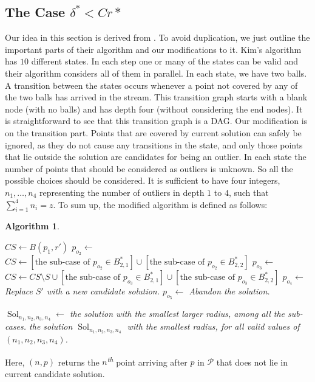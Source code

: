 \documentclass[envcountsame]{cls/cccg15}
\newtheorem{algorithm}{Algorithm}
\newcommand{\nth}{\textsuperscript{\textit{th}} }
\newcommand{\set}[1]{\left\{ #1 \right\}}
\newcommand{\provided}{\,:\,}
\begin{document}
\subsection{The Case $\delta^* < C r*$}
\label{subsec:smaller}
Our idea in this section is derived from \cite{ahn2014computing, kim2014improved}. To avoid duplication, we just outline the important parts of their algorithm and our modifications to it. Kim's algorithm has $10$ different states. In each step one or many of the states can be valid and their algorithm considers all of them in parallel. In each state, we have two balls. A transition between the states occurs whenever a point not covered by any of the two balls has arrived in the stream. This transition graph starts with a blank node (with no balls) and has depth four (without considering the end nodes). It is straightforward to see that this transition graph is a DAG.
Our modification is on the transition part.
Points that are covered by current solution can safely be ignored, as they do not cause any transitions in the state, and only those points that lie outside the solution are candidates for being an outlier.
In each state the number of points that should be considered as outliers is unknown. So all the possible choices should be considered. It is sufficient to have four integers, $n_1,\dots, n_4$ representing the number of outliers in depth $1$ to $4$, such that $\sum_{i=1}^{4} n_i=z$. To sum up, the modified algorithm is defined as follows:
{
\algrenewcommand\algorithmicindent{0.8em}%
\begin{algorithm}
\label{alg:smallc}
\leavevmode
\begin{algorithmic}
	\For{$(n_1, \dots, n_4) \gets \set{(n_1, \dots, n_4) \provided \sum n_i=z}$}
		\State $CS \gets B(p_1,r')$
		\State $p_{o_2} \gets $ 
			\State $CS\gets [ \text{the sub-case of $p_{o_2} \in B_{2, 1}^*$} ] \cup [ \text{the sub-case of $p_{o_2} \in B_{2,2}^*$} ]$
				\State $p_{o_3} \gets$ 
					\State $CS\gets CS\setminus S \cup [ \text{the sub-case of $p_{o_3} \in B_{2, 1}^*$} ] \cup [ \text{the sub-case of $p_{o_3} \in B_{2,2}^*$}]$
						\State $p_{o_4} \gets$ 
							\State Replace $S'$ with a new candidate solution.
							\State $p_{o_5} \gets$ 
								\State Abandon the solution.
							\EndIf
						\EndIf
					\EndFor
				\EndIf
			\EndFor

		\EndIf
		\State $\mathop{Sol}_{n_1,n_2,n_3,n_4} \gets$ the solution with the smallest larger radius, among all the sub-cases.
	\EndFor
	\State \Return the solution $\mathop{Sol}_{n_1,n_2,n_3,n_4}$ with the smallest radius, for all valid values of $(n_1,n_2,n_3,n_4)$.
\EndFunction
\end{algorithmic}
\end{algorithm}
}
Here, $(n,p)$ returns the $n$\nth point arriving after $p$ in $\mathcal{P}$ that does not lie in current candidate solution.
\end{document}
